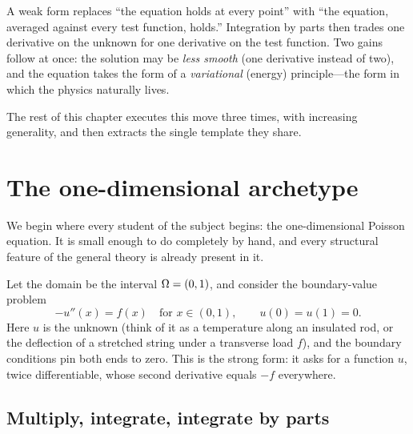 \begin{keyidea}
A weak form replaces ``the equation holds at every point'' with ``the equation,
averaged against every test function, holds.'' Integration by parts then trades
one derivative on the unknown for one derivative on the test function. Two gains
follow at once: the solution may be \emph{less smooth} (one derivative instead
of two), and the equation takes the form of a \emph{variational} (energy)
principle---the form in which the physics naturally lives.
\end{keyidea}

The rest of this chapter executes this move three times, with increasing
generality, and then extracts the single template they share.

\section{The one-dimensional archetype}
\label{sec:1d}

We begin where every student of the subject begins: the one-dimensional
Poisson equation. It is small enough to do completely by hand, and every
structural feature of the general theory is already present in it.

Let the domain be the interval $\Omega = (0,1)$, and consider the boundary-value
problem
\begin{equation}
  -u''(x) = f(x) \quad\text{for } x\in(0,1), \qquad u(0)=u(1)=0.
  \label{eq:1d-strong}
\end{equation}
Here $u$ is the unknown (think of it as a temperature along an insulated rod, or
the deflection of a stretched string under a transverse load $f$), and the
boundary conditions pin both ends to zero. This is the strong form: it asks for
a function $u$, twice differentiable, whose second derivative equals $-f$
everywhere.

\subsection{Multiply, integrate, integrate by parts}

